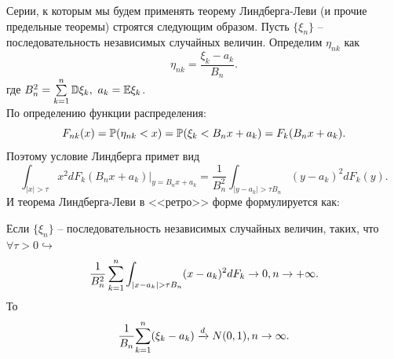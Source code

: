 \begin{note}
    Серии, к которым мы будем применять теорему Линдберга-Леви (и прочие предельные теоремы) строятся следующим образом.
    Пусть $\{\xi_n\}$ -- последовательность независимых случайных величин.
    Определим $\eta_{nk}$ как
    \[
        \eta_{nk} = \dfrac{\xi_k - a_k}{B_n}.
    \]
    где $B_n^2 = \sum\limits_{k = 1}^{n} \D \xi_k, \ a_k = \Ex\xi_k$. \\
    По определению функции распределения:
    \[
        F_{nk}(x) = \P(\eta_{nk} < x) = \P(\xi_k < B_n x + a_k) = F_{k}(B_n x + a_k).
    \]
    Поэтому условие Линдберга примет вид
    \[
        \int_{|x| > \tau} x^2 dF_{k}(B_n x + a_k)\biggr|_{y = B_n x + a_k} = \dfrac{1}{B_n^2} \int_{|y - a_k| > \tau B_n} (y - a_k)^2 dF_k(y).
    \]
    И теорема Линдберга-Леви в <<ретро>> форме формулируется как:
    \begin{theorem}
        Если $\{\xi_n\}$ -- последовательность независимых случайных величин, таких, что $\forall \tau > 0 \hookrightarrow$
        \[
            \dfrac{1}{B_n^2}\sum\limits_{k = 1}^{n} \int_{|x - a_k| > \tau B_n} (x - a_k)^{2}dF_k  \ra 0, n \ra +\infty.
        \]
        То 
        \[
            \dfrac{1}{B_n}{\sum_{k = 1}^n (\xi_k - a_k)} \xrightarrow{d} N(0, 1), n \ra \infty.
        \]
    \end{theorem}
\end{note}
